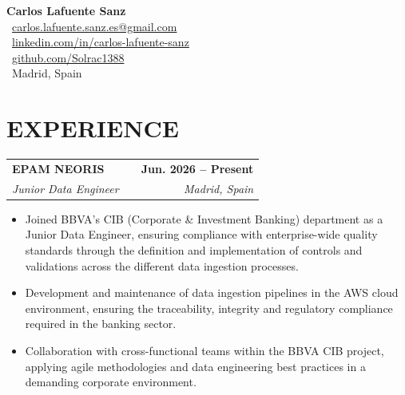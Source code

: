 \documentclass[a4paper,10pt]{article}
\makeatletter
\newcommand{\smallblacksquare}{\raisebox{0.4ex}{\rule{0.6ex}{0.6ex}}}
\newenvironment{joblong}[4]
{
	\begin{tabularx}{\linewidth}{@{}l X r@{}}
		\textbf{#1} & \hfill & \textbf{#2} \\
		\small\textit{#3} & \hfill & \small\textit{#4} \\[3.75pt]
	\end{tabularx}
	\begin{minipage}[t]{\linewidth}
		\begin{itemize}[nosep,after=\strut, leftmargin=1em, itemsep=3pt,label=\smallblacksquare]
		}
		{
		\end{itemize}
	\end{minipage}    
}
\makeatother
\begin{document}
	
	\pagestyle{empty} 
	
	
	\begin{flushleft}
		\Huge{\textbf{Carlos Lafuente Sanz}} \\[4pt]
		\vspace{4pt}
		\normalsize
		\faEnvelope \ \href{mailto:carlos.lafuente.sanz.es@gmail.com}{carlos.lafuente.sanz.es@gmail.com} \\
		\faLinkedin \ \href{https://linkedin.com/in/carlos-lafuente-sanz}{linkedin.com/in/carlos-lafuente-sanz} \\
		\faGithub \ \href{https://github.com/Solrac1388}{github.com/Solrac1388} \\
		\faHome \ Madrid, Spain
	\end{flushleft}
	\vspace{-10pt}
	\noindent\titlerule
	\vspace{8pt}
	
	
	\section{EXPERIENCE}
	
	\begin{joblong}{EPAM NEORIS}{Jun. 2026 – Present}{Junior Data Engineer}{Madrid, Spain}
		\item Joined BBVA's CIB (Corporate \& Investment Banking) department as a Junior Data Engineer, ensuring compliance with enterprise-wide quality standards through the definition and implementation of controls and validations across the different data ingestion processes.
		\item Development and maintenance of data ingestion pipelines in the AWS cloud environment, ensuring the traceability, integrity and regulatory compliance required in the banking sector.
		\item Collaboration with cross-functional teams within the BBVA CIB project, applying agile methodologies and data engineering best practices in a demanding corporate environment.
	\end{joblong}
	
\end{document}
